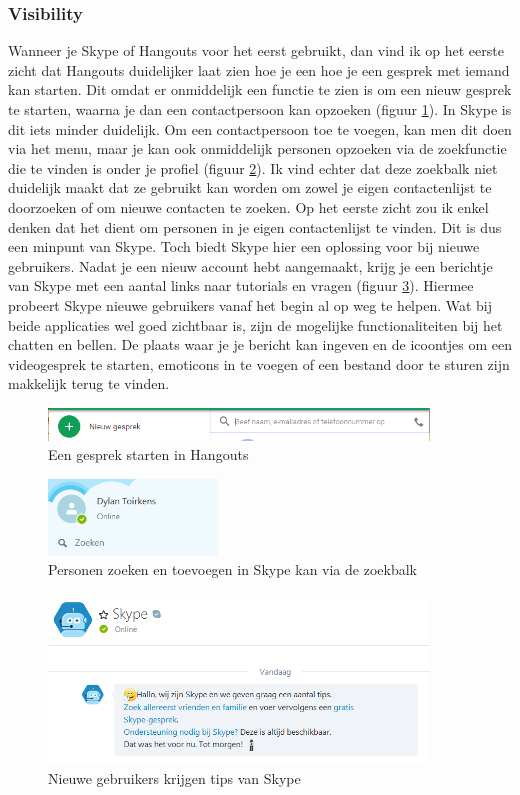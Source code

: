 \documentclass[11pt]{article}
\begin{document}
\subsubsection{Visibility}
Wanneer je Skype of Hangouts voor het eerst gebruikt, dan vind ik op het eerste zicht dat Hangouts duidelijker laat zien hoe je een hoe je een gesprek met iemand kan starten. Dit omdat er onmiddelijk een functie te zien is om een nieuw gesprek te starten, waarna je dan een contactpersoon kan opzoeken (figuur \ref{fig:HNieuwGesprek}). In Skype is dit iets minder duidelijk. Om een contactpersoon toe te voegen, kan men dit doen via het menu, maar je kan ook onmiddelijk personen opzoeken via de zoekfunctie die te vinden is onder je profiel (figuur \ref{fig:SZoeken}). Ik vind echter dat deze zoekbalk niet duidelijk maakt dat ze gebruikt kan worden om zowel je eigen contactenlijst te doorzoeken of om nieuwe contacten te zoeken. Op het eerste zicht zou ik enkel denken dat het dient om personen in je eigen contactenlijst te vinden. Dit is dus een minpunt van Skype. Toch biedt Skype hier een oplossing voor bij nieuwe gebruikers. Nadat je een nieuw account hebt aangemaakt, krijg je een berichtje van Skype met een aantal links naar tutorials en vragen (figuur \ref{fig:STips}). Hiermee probeert Skype nieuwe gebruikers vanaf het begin al op weg te helpen. Wat bij beide applicaties wel goed zichtbaar is, zijn de mogelijke functionaliteiten bij het chatten en bellen. De plaats waar je je bericht kan ingeven en de icoontjes om een videogesprek te starten, emoticons in te voegen of een bestand door te sturen zijn makkelijk terug te vinden. 
 \begin{figure}
	\centering
	\includegraphics[width=0.9\textwidth]{Dylan_HNieuwGesprek.png}
	\caption{Een gesprek starten in Hangouts}
	\label{fig:HNieuwGesprek}
\end{figure}
\begin{figure}
	\centering
	\includegraphics[width=0.4\textwidth]{Dylan_SZoeken.png}
	\caption{Personen zoeken en toevoegen in Skype kan via de zoekbalk}
	\label{fig:SZoeken}
\end{figure}
\begin{figure}
	\centering
	\includegraphics[width=0.9\textwidth]{Dylan_STips.png}
	\caption{Nieuwe gebruikers krijgen tips van Skype}
	\label{fig:STips}
\end{figure}
\end{document}
